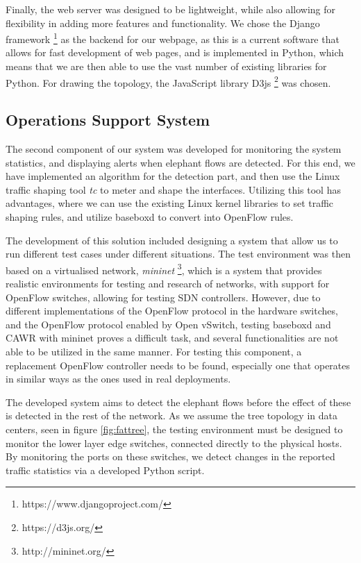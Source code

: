\par Finally, the web server was designed to be lightweight, while also allowing for flexibility in adding more features and functionality. We chose the Django framework \footnote{https://www.djangoproject.com/} as the backend 
for our webpage, as this is a current software that allows for fast development of web pages, and is implemented in Python, which means that we are then able to use the vast number of existing libraries for Python. For
drawing the topology, the JavaScript library D3js \footnote {https://d3js.org/} was chosen.

\subsection {Operations Support System}

The second component of our system was developed for monitoring the system statistics, and displaying alerts when elephant flows are detected. For this end, we have implemented an algorithm for the detection part, and then use 
the Linux traffic shaping tool \textit {tc} to meter and shape the interfaces. Utilizing this tool has advantages, where we can use the existing Linux kernel libraries to set traffic shaping rules, and utilize baseboxd to convert
into OpenFlow rules.

\par The development of this solution included designing a system that allow us to run different test cases under different situations. The test environment was then based on a virtualised network, \textit{mininet} 
\footnote{http://mininet.org/}, which is a system that provides realistic environments for testing and research of networks, with support for OpenFlow switches, allowing for testing SDN controllers. However, due to different 
implementations of the OpenFlow protocol in the hardware switches, and the OpenFlow protocol enabled by Open vSwitch, testing baseboxd and CAWR with mininet proves a difficult task, and several functionalities are not able to be 
utilized in the same manner. For testing this component, a replacement OpenFlow controller needs to be found, especially one that operates in similar ways as the ones used in real deployments. 

\par The developed system aims to detect the elephant flows before the effect of these is detected in the rest of the network. As we assume the tree topology in data centers, seen in figure \ref{fig:fattree}, the testing environment
must be designed to monitor the lower layer edge switches, connected directly to the physical hosts. By monitoring the ports on these switches, we detect changes in the reported traffic statistics via a developed Python script.

